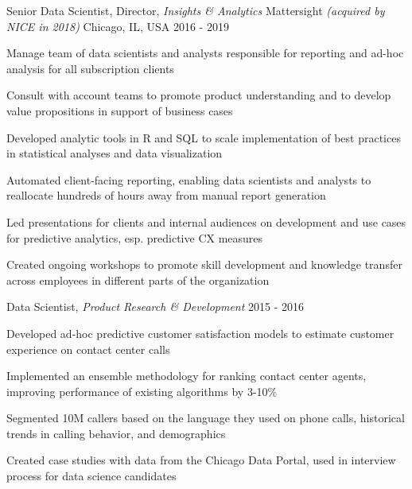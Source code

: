 \begin{cventries}
 \cventry
    {Senior Data Scientist, Director, \textit{Insights \& Analytics}} %
    {Mattersight \textit{\textmd{(acquired by NICE in 2018)}}} %
    {Chicago, IL, USA} %
    {2016 - 2019} %
    {
      \begin{cvitems}
        \item {Manage team of data scientists and analysts responsible for reporting and ad-hoc analysis for all subscription clients}
        \item {Consult with account teams to promote product understanding and to develop value propositions in support of business cases}
        \item {Developed analytic tools in R and SQL to scale implementation of best practices in statistical analyses and data visualization}
        \item {Automated client-facing reporting, enabling data scientists and analysts to reallocate hundreds of hours away from manual report generation}
        \item {Led presentations for clients and internal audiences on development and use cases for predictive analytics, esp. predictive CX measures}
        \item {Created ongoing workshops to promote skill development and knowledge transfer across employees in different parts of the organization}
      \end{cvitems}
    }

  \cventry
    {Data Scientist, \textit{Product Research \& Development}} %
    {} %
    {} %
    {2015 - 2016} %
    {
      \begin{cvitems} %
        \item {Developed ad-hoc predictive customer satisfaction models to estimate customer experience on contact center calls}
        \item {Implemented an ensemble methodology for ranking contact center agents, improving performance of existing algorithms by 3-10\%}
        \item {Segmented 10M callers based on the language they used on phone calls, historical trends in calling behavior, and demographics}
        \item {Created case studies with data from the Chicago Data Portal, used in interview process for data science candidates}
      \end{cvitems}
    }


\end{cventries}
